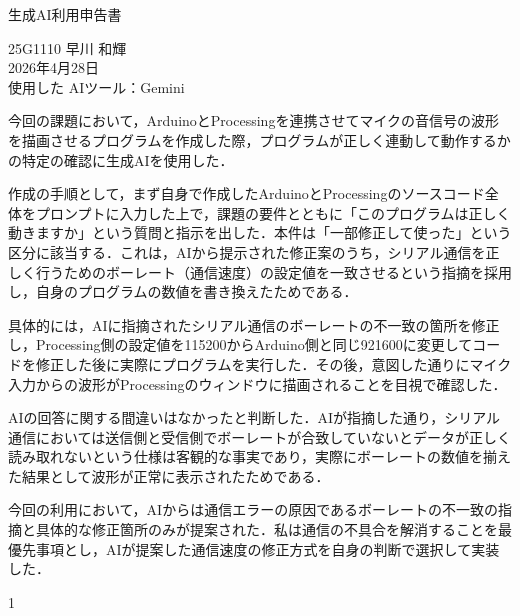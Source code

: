 \documentclass[uplatex,dvipdfmx,ja=standard,a4paper,11pt]{bxjsarticle}
\begin{document}
\begin{center}
    {\huge 生成AI利用申告書}
\end{center}

\vspace{1.5em}

\noindent
25G1110 早川 和輝 \\
2026年4月28日 \\
使用した AIツール：Gemini

\vspace{2em}

\noindent
今回の課題において，ArduinoとProcessingを連携させてマイクの音信号の波形を描画させるプログラムを作成した際，プログラムが正しく連動して動作するかの特定の確認に生成AIを使用した．

\vspace{1em}

\noindent
作成の手順として，まず自身で作成したArduinoとProcessingのソースコード全体をプロンプトに入力した上で，課題の要件とともに「このプログラムは正しく動きますか」という質問と指示を出した．本件は「一部修正して使った」という区分に該当する．これは，AIから提示された修正案のうち，シリアル通信を正しく行うためのボーレート（通信速度）の設定値を一致させるという指摘を採用し，自身のプログラムの数値を書き換えたためである．

\vspace{1em}

\noindent
具体的には，AIに指摘されたシリアル通信のボーレートの不一致の箇所を修正し，Processing側の設定値を115200からArduino側と同じ921600に変更してコードを修正した後に実際にプログラムを実行した．その後，意図した通りにマイク入力からの波形がProcessingのウィンドウに描画されることを目視で確認した．

\vspace{1em}

\noindent
AIの回答に関する間違いはなかったと判断した．AIが指摘した通り，シリアル通信においては送信側と受信側でボーレートが合致していないとデータが正しく読み取れないという仕様は客観的な事実であり，実際にボーレートの数値を揃えた結果として波形が正常に表示されたためである．

\vspace{1em}

\noindent
今回の利用において，AIからは通信エラーの原因であるボーレートの不一致の指摘と具体的な修正箇所のみが提案された．私は通信の不具合を解消することを最優先事項とし，AIが提案した通信速度の修正方式を自身の判断で選択して実装した．

\vfill
\begin{center}
1
\end{center}
\end{document}
